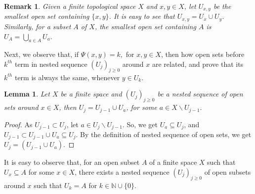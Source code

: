 \documentclass[12pt]{amsart}
\newtheorem{lemma}[definition]{Lemma}
\newtheorem{remark}[definition]{Remark}
\begin{document}
\begin{remark}{\normalfont
		Given a finite topological space $X$ and $x,y\in X$, let $U_{x,y}$ be the smallest open set containing $\{x,y\}$. %
		It is easy to see that  $U_{x,y} = U_{x} \cup U_{y}$. 
		Similarly, for a subset $A$ of $X$, the smallest open set containing $A$ is $U_A= \bigcup\limits_{a\in A} U_a.$
	}
\end{remark}

Next, we observe that, if $\Psi(x,y)=k,$ for $x,y\in X$, then how open sets before $k^{th}$ term in nested sequence $(U_j)_{j\geq 0}$ around $x$ are related, and prove that its $k^{th}$ term is always  the same, whenever $y\in U_k$.

\begin{lemma}\label{2.8.}
	Let $X$ be a finite space and $(U_j)_{j\geq0}$ be a nested sequence of open sets around $x\in X$, then $U_j= U_{j-1}\cup U_a$, for some $a\in X\backslash U_{j-1}$.
\end{lemma}

\begin{proof}
	As $U_{j-1}\subset U_{j}$, let $a\in U_j\backslash U_{j-1}$. So, we get $U_a\subseteq U_j$, and $U_{j-1}\subset U_{j-1}\cup U_a \subseteq U_j$. By the definition of nested sequence of open sets, we get $U_{j}=(U_{j-1}\cup U_a)$.
\end{proof}

It is easy to observe that, for an open subset $A$ of a finite  space $X$ such that $U_x\subseteq A$ for some $x\in X$, there exists a nested sequence $(U_j)_{j\geq 0}$ of open subsets around $x$ such that $U_k= A$ for $k\in \mathbb{N}\cup \{0\}$. 
\end{document}
